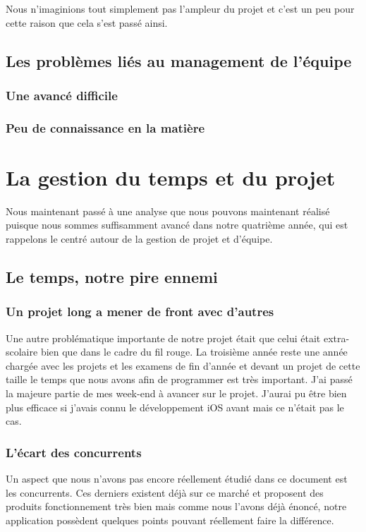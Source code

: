 \documentclass{article}
\begin{document}
		Nous n'imaginions tout simplement pas l'ampleur du projet et c'est un peu pour cette raison que cela s'est passé ainsi.
\subsection{Les problèmes liés au management de l'équipe}
\subsubsection{Une avancé difficile}
\subsubsection{Peu de connaissance en la matière}


\section{La gestion du temps et du projet}
		Nous maintenant passé à une analyse que nous pouvons maintenant réalisé puisque nous sommes suffisamment avancé dans notre quatrième année, qui est rappelons le centré autour de la gestion de projet et d'équipe.
		
\subsection{Le temps, notre pire ennemi}
\subsubsection{Un projet long a mener de front avec d'autres}
		Une autre problématique importante de notre projet était que celui était extra-scolaire bien que dans le cadre du fil rouge. La troisième année reste une année chargée avec les projets et les examens de fin d'année et devant un projet de cette taille le temps que nous avons afin de programmer est très important. J'ai passé la majeure partie de mes week-end à avancer sur le projet. J'aurai pu être bien plus efficace si j'avais connu le développement iOS avant mais ce n'était pas le cas.

\subsubsection{L'écart des concurrents}
		Un aspect que nous n'avons pas encore réellement étudié dans ce document est les concurrents. Ces derniers existent déjà sur ce marché et proposent des produits fonctionnement très bien mais comme nous l'avons déjà énoncé, notre application possèdent quelques points pouvant réellement faire la différence.
		
\end{document}
